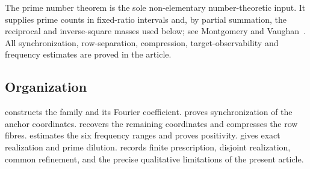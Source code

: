 The prime number theorem is the sole non-elementary number-theoretic input. It supplies prime counts in fixed-ratio intervals and, by partial summation, the reciprocal and inverse-square masses used below; see Montgomery and Vaughan~\cite[Chapter~1]{montgomery-vaughan-2007}. All synchronization, row-separation, compression, target-observability and frequency estimates are proved in the article.

\subsection{Organization}

 constructs the family and its Fourier coefficient.  proves synchronization of the anchor coordinates.  recovers the remaining coordinates and compresses the row fibres.  estimates the six frequency ranges and proves positivity.  gives exact realization and prime dilution.  records finite prescription, disjoint realization, common refinement, and the precise qualitative limitations of the present article.
